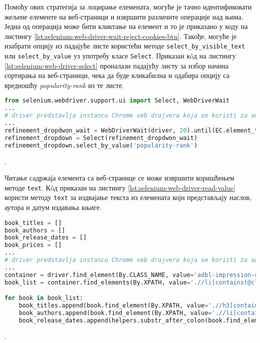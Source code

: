\documentclass[12pt,oneside]{memoir}
\begin{document}
Помоћу ових стратегија за лоцирање елемената, могуће је тачно идентификовати жељене елементе на веб-страници и извршити различите операције над њима. Једна од операција може бити кликтање на елемент и то је приказано у коду на листингу \ref{lst:selenium-web-driver-wait-reject-cookies-btn}. Такође, могуће је изабрати опцију из падајуће листе користећи методе \texttt{select\_by\_visible\_text} или \texttt{select\_by\_value} уз употребу класе \texttt{Select}. Приказан кôд на листингу \ref{lst:selenium-web-driver-select} проналази падајућу листу за избор начина сортирања на веб-страници, чека да буде кликабилна и одабира опцију са вредношћу \textit{popularity-rank} из те листе.
\begin{lstlisting}[language=Python, caption={Одабир опције из падајућег менија}, label={lst:selenium-web-driver-select}]
from selenium.webdriver.support.ui import Select, WebDriverWait
...
# driver predstavlja instancu Chrome veb drajvera koja se koristi za automatizaciju pregledaca
...
refinement_dropdwon_wait = WebDriverWait(driver, 20).until(EC.element_to_be_clickable((By.XPATH, "//select[@aria-labelledby='sortBy']")))
refinement_dropdown = Select(refinement_dropdwon_wait)
refinement_dropdown.select_by_value('popularity-rank')
\end{lstlisting}.

Читање садржаја елемента са веб-странице се може извршити коришћењем методе \texttt{text}. Кôд приказан на листингу \ref{lst:selenium-web-driver-read-value} користи методу \texttt{text} за издвајање текста из елемената који представљају наслов, аутора и датум издавања књиге.
\begin{lstlisting}[language=Python, caption={Читање садржаја елемента}, label={lst:selenium-web-driver-read-value}]
book_titles = []
book_authors = []
book_release_dates = []
book_prices = []
...
# driver predstavlja instancu Chrome veb drajvera koja se koristi za automatizaciju pregledaca
...
container = driver.find_element(By.CLASS_NAME, value='adbl-impression-container ')
book_list = container.find_elements(By.XPATH, value='.//li[contains(@class, "productListItem")]')

for book in book_list:
    book_titles.append(book.find_element(By.XPATH, value='.//h3[contains(@class, "bc-heading")]').text.strip())
    book_authors.append(book.find_element(By.XPATH, value='.//li[contains(@class, "authorLabel")]').find_element(By.TAG_NAME, 'a').get_attribute('innerHTML'))
    book_release_dates.append(helpers.substr_after_colon(book.find_element(By.XPATH, value='.//li[contains(@class, "releaseDateLabel")]').text.strip()))
\end{lstlisting}.
\end{document}

